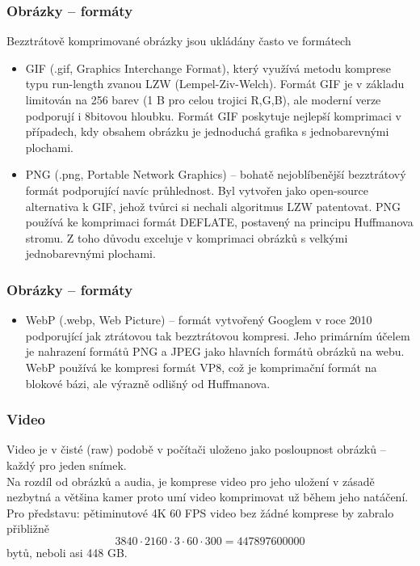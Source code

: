 \documentclass[aspectratio=169,11pt,svgnames,handout]{beamer}
\begin{document}
\begin{frame}
 \frametitle{Obrázky -- formáty}
 Bezztrátově komprimované obrázky jsou ukládány často ve formátech
 \begin{itemize}[label=\textbullet]
  \item \alert{GIF} (.gif, Graphics Interchange Format), který využívá metodu
   komprese typu run-length zvanou LZW (Lempel-Ziv-Welch). Formát GIF je v
   základu limitován na 256 barev (1 B pro celou trojici R,G,B), ale moderní
   verze podporují i 8bitovou hloubku. Formát GIF poskytuje nejlepší komprimaci
   v případech, kdy obsahem obrázku je jednoduchá grafika s jednobarevnými
   plochami.
  \pause
  \item \alert{PNG} (.png, Portable Network Graphics) -- bohatě nejoblíbenější
   bezztrátový formát podporující navíc \alert{průhlednost}. Byl vytvořen jako
   open-source alternativa k GIF, jehož tvůrci si nechali algoritmus LZW
   patentovat. PNG používá ke komprimaci formát DEFLATE, postavený na principu
   Huffmanova stromu. Z toho důvodu exceluje v komprimaci obrázků s velkými
   jednobarevnými plochami.
 \end{itemize}
\end{frame}

\begin{frame}
 \frametitle{Obrázky -- formáty}
 \begin{itemize}[label=\textbullet]
  \item \alert{WebP} (.webp, Web Picture) -- formát vytvořený Googlem v roce
   2010 podporující jak ztrátovou tak bezztrátovou kompresi. Jeho primárním
   účelem je nahrazení formátů PNG a JPEG jako hlavních formátů obrázků na webu.
   WebP používá ke kompresi formát \alert{VP8}, což je komprimační formát na
   blokové bázi, ale výrazně odlišný od Huffmanova.
 \end{itemize}
\end{frame}

\begin{frame}
 \frametitle{Video}
 Video je v čisté (raw) podobě v počítači uloženo jako posloupnost obrázků --
 každý pro jeden snímek.\pause\\
 Na rozdíl od obrázků a audia, je komprese video pro jeho uložení v zásadě
 nezbytná a většina kamer proto umí video komprimovat už během jeho
 natáčení.\pause\\
 Pro představu: pětiminutové 4K 60 FPS video bez žádné komprese by zabralo
 přibližně
 \[
  3840 \cdot 2160 \cdot 3 \cdot 60 \cdot 300 = 447897600000
 \]
 bytů, neboli asi 448 GB.
\end{frame}
\end{document}
